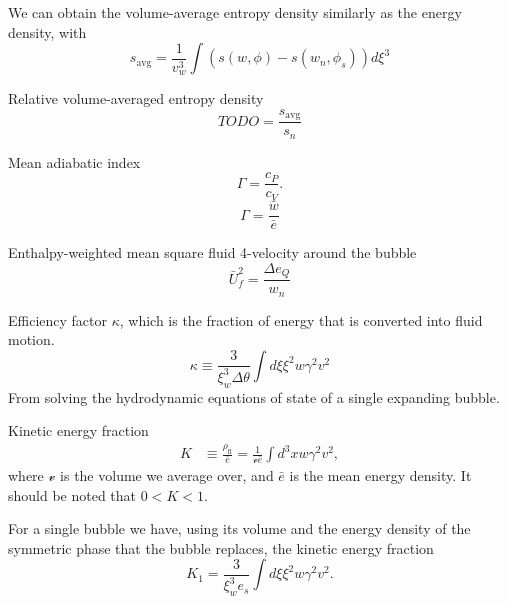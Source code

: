 We can obtain the volume-average entropy density similarly as the energy density, with
\begin{equation}
s_\text{avg} = \frac{1}{v_w^3} \int \left( s(w,\phi) - s(w_n, \phi_s) \right) d\xi^3
\end{equation}

Relative volume-averaged entropy density
\begin{equation}
TODO = \frac{s_\text{avg}}{s_n}
\end{equation}

Mean adiabatic index
\begin{equation}
\Gamma = \frac{c_P}{c_V}.
\end{equation}
\begin{equation}
\Gamma = \frac{\bar{w}}{\bar{e}}
\end{equation}

Enthalpy-weighted mean square fluid 4-velocity around the bubble
\begin{equation}
\bar{U}_f^2 = \frac{\Delta e_Q}{w_n}
\end{equation}




Efficiency factor $\kappa$, which is the fraction of energy that is converted into fluid motion.
\begin{equation}
\kappa \equiv \frac{3}{\xi_w^3 \Delta \theta} \int d\xi \xi^2 w \gamma^2 v^2
\end{equation}
From solving the hydrodynamic equations of state of a single expanding bubble.

Kinetic energy fraction
\cites[eq. 7.36]{lecture_notes}[eq. 5]{giese_2020}
\begin{align}
K
&\equiv \frac{\rho_\text{fl}}{\bar{e}}
= \frac{1}{\mathcal{v} \bar{e}} \int d^3 x w \gamma^2 v^2,
\end{align}
where $\mathcal{v}$ is the volume we average over, and $\bar{e}$ is the mean energy density.
It should be noted that $0 < K < 1$.
\cite{giese_2020}

For a single bubble we have, using its volume and the energy density of the symmetric phase that the bubble replaces, the kinetic energy fraction
\cites[eq. 7.37]{lecture_notes}[eq. 5]{giese_2020}
\begin{equation}
K_1 = \frac{3}{\xi_w^3 e_s} \int d\xi \xi^2 w \gamma^2 v^2.
\end{equation}

